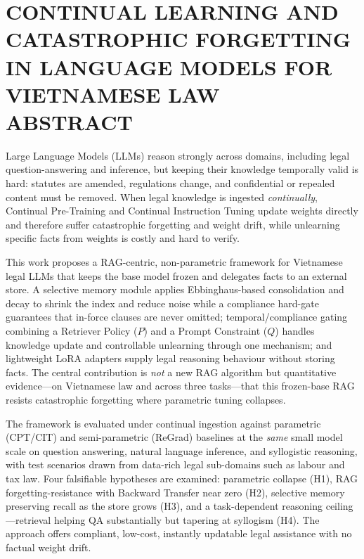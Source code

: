 \chapter*{CONTINUAL LEARNING AND CATASTROPHIC FORGETTING IN LANGUAGE MODELS FOR VIETNAMESE LAW\\ABSTRACT}

Large Language Models (LLMs) reason strongly across domains, including legal question-answering and inference, but keeping their knowledge temporally valid is hard: statutes are amended, regulations change, and confidential or repealed content must be removed. When legal knowledge is ingested \emph{continually}, Continual Pre-Training and Continual Instruction Tuning update weights directly and therefore suffer catastrophic forgetting and weight drift, while unlearning specific facts from weights is costly and hard to verify.

This work proposes a RAG-centric, non-parametric framework for Vietnamese legal LLMs that keeps the base model frozen and delegates facts to an external store. A selective memory module applies Ebbinghaus-based consolidation and decay to shrink the index and reduce noise while a compliance hard-gate guarantees that in-force clauses are never omitted; temporal/compliance gating combining a Retriever Policy ($P$) and a Prompt Constraint ($Q$) handles knowledge update and controllable unlearning through one mechanism; and lightweight LoRA adapters supply legal reasoning behaviour without storing facts. The central contribution is \emph{not} a new RAG algorithm but quantitative evidence---on Vietnamese law and across three tasks---that this frozen-base RAG resists catastrophic forgetting where parametric tuning collapses.

The framework is evaluated under continual ingestion against parametric (CPT/CIT) and semi-parametric (ReGrad) baselines at the \emph{same} small model scale on question answering, natural language inference, and syllogistic reasoning, with test scenarios drawn from data-rich legal sub-domains such as labour and tax law. Four falsifiable hypotheses are examined: parametric collapse (H1), RAG forgetting-resistance with Backward Transfer near zero (H2), selective memory preserving recall as the store grows (H3), and a task-dependent reasoning ceiling---retrieval helping QA substantially but tapering at syllogism (H4). The approach offers compliant, low-cost, instantly updatable legal assistance with no factual weight drift.
